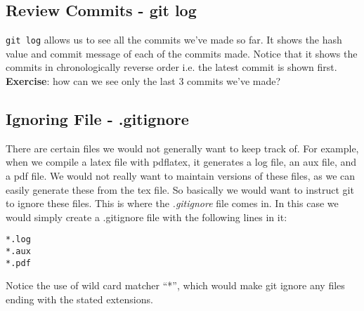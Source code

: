 \documentclass{article}
\begin{document}
\subsection{Review Commits - git log}
\verb|git log| allows us to see all the commits we've made so far.
It shows the hash value and commit message of each of the commits made.
Notice that it shows the commits in chronologically reverse order i.e. the latest commit is shown first.
\\\textbf{Exercise}: how can we see only the last 3 commits we've made?

\subsection{Ignoring File - .gitignore}
There are certain files we would not generally want to keep track of.
For example, when we compile a latex file with pdflatex, it generates a log file, an aux file, and a pdf file.
We would not really want to maintain versions of these files, as we can easily generate these from the tex file.
So basically we would want to instruct git to ignore these files. This is where the \textit{.gitignore} file comes in.
In this case we would simply create a .gitignore file with the following lines in it:
\begin{verbatim}
*.log
*.aux
*.pdf
\end{verbatim}
Notice the use of wild card matcher ``*'', which would make git ignore any files ending with the stated extensions.
\end{document}
